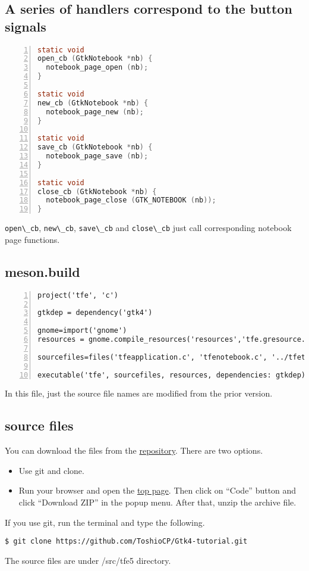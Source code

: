 \subsection{A series of handlers correspond to the button
signals}\label{a-series-of-handlers-correspond-to-the-button-signals}

\begin{lstlisting}[language=C, numbers=left]
static void
open_cb (GtkNotebook *nb) {
  notebook_page_open (nb);
}

static void
new_cb (GtkNotebook *nb) {
  notebook_page_new (nb);
}

static void
save_cb (GtkNotebook *nb) {
  notebook_page_save (nb);
}

static void
close_cb (GtkNotebook *nb) {
  notebook_page_close (GTK_NOTEBOOK (nb));
}
\end{lstlisting}

\passthrough{\lstinline!open\_cb!}, \passthrough{\lstinline!new\_cb!},
\passthrough{\lstinline!save\_cb!} and
\passthrough{\lstinline!close\_cb!} just call corresponding notebook
page functions.

\subsection{meson.build}\label{meson.build}

\begin{lstlisting}[numbers=left]
project('tfe', 'c')

gtkdep = dependency('gtk4')

gnome=import('gnome')
resources = gnome.compile_resources('resources','tfe.gresource.xml')

sourcefiles=files('tfeapplication.c', 'tfenotebook.c', '../tfetextview/tfetextview.c')

executable('tfe', sourcefiles, resources, dependencies: gtkdep)
\end{lstlisting}

In this file, just the source file names are modified from the prior
version.

\subsection{source files}\label{source-files}

You can download the files from the
\href{https://github.com/ToshioCP/Gtk4-tutorial}{repository}. There are
two options.

\begin{itemize}
\tightlist
\item
  Use git and clone.
\item
  Run your browser and open the
  \href{https://github.com/ToshioCP/Gtk4-tutorial}{top page}. Then click
  on ``Code'' button and click ``Download ZIP'' in the popup menu. After
  that, unzip the archive file.
\end{itemize}

If you use git, run the terminal and type the following.

\begin{lstlisting}
$ git clone https://github.com/ToshioCP/Gtk4-tutorial.git
\end{lstlisting}

The source files are under /src/tfe5 directory.
